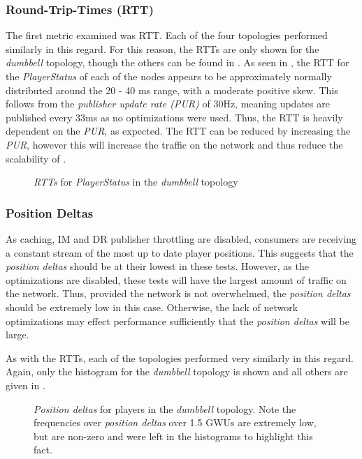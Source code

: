 \subsubsection*{Round-Trip-Times (RTT)}
The first metric examined was RTT. Each of the four topologies performed similarly in this regard. For this reason, the RTTs are only shown for the \textit{dumbbell} topology, though the others can be found in . As seen in , the RTT for the \textit{PlayerStatus} of each of the nodes appears to be approximately normally distributed around the 20 - 40 ms range, with a moderate positive skew. This follows from the \textit{publisher update rate (PUR)} of 30Hz, meaning updates are published every 33ms as no optimizations were used. Thus, the RTT is heavily dependent on the \textit{PUR}, as expected. The RTT can be reduced by increasing the \textit{PUR}, however this will increase the traffic on the network and thus reduce the scalability of \game{}.  

\begin{figure}[H]
    \centering
    \caption{\textit{RTTs} for \textit{PlayerStatus} in the \textit{dumbbell} topology}
    \label{fig:eval:basic:rtt}
\end{figure}


\subsubsection*{Position Deltas}
As caching, IM and DR publisher throttling are disabled, consumers are receiving a constant stream of the most up to date player positions. This suggests that the \textit{position deltas} should be at their lowest in these tests. However, as the optimizations are disabled, these tests will have the largest amount of traffic on the network. Thus, provided the network is not overwhelmed, the \textit{position deltas} should be extremely low in this case. Otherwise, the lack of network optimizations may effect performance sufficiently that the \textit{position deltas} will be large. 

As with the RTTs, each of the topologies performed very similarly in this regard. Again, only the histogram for the \textit{dumbbell} topology is shown and all others are given in .

\begin{figure}[H]
    \centering
    \caption{\textit{Position deltas} for players in the \textit{dumbbell} topology. Note the frequencies over \textit{position deltas} over 1.5 GWUs are extremely low, but are non-zero and were left in the histograms to highlight this fact.}
    \label{fig:eval:basic:pos-deltas}
\end{figure}

